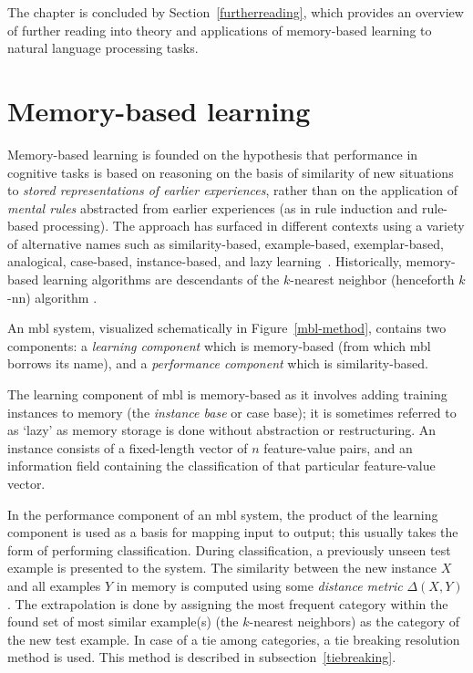\documentclass{report}
\begin{document}
The chapter is concluded by Section~\ref{furtherreading}, which
provides an overview of further reading into theory and applications
of memory-based learning to natural language processing tasks.

\section{Memory-based learning}
\label{mbl}

Memory-based learning is founded on the hypothesis that performance in
cognitive tasks is based on reasoning on the basis of similarity of
new situations to {\em stored representations of earlier experiences},
rather than on the application of {\em mental rules}\/ abstracted from
earlier experiences (as in rule induction and rule-based processing).
The approach has surfaced in different contexts using a variety of
alternative names such as similarity-based, example-based,
exemplar-based, analogical, case-based, in\-stance-based, and lazy
learning~\cite{Stanfill+86,Aha+91,Cost+93,Kolodner93,Aha97a}.
Historically, memory-based learning algorithms are descendants of the
$k$-nearest neighbor (henceforth $k$-{\sc nn}) algorithm
\cite{Cover+67,Devijver+82,Aha+91}.

An {\sc mbl} system, visualized schematically in
Figure~\ref{mbl-method}, contains two components: a {\em learning
component}\/ which is memory-based (from which {\sc mbl} borrows its
name), and a {\em performance component}\/ which is similarity-based.

The learning component of {\sc mbl} is memory-based as it involves
adding training instances to memory (the {\em instance base} or case
base); it is sometimes referred to as `lazy' as memory storage is done
without abstraction or restructuring.  An instance consists of a
fixed-length vector of $n$ feature-value pairs, and an information
field containing the classification of that particular feature-value
vector.  

In the performance component of an {\sc mbl} system, the product of
the learning component is used as a basis for mapping input to output;
this usually takes the form of performing classification.  During
classification, a previously unseen test example is presented to the
system. The similarity between the new instance $X$ and all examples
$Y$ in memory is computed using some {\em distance metric}
$\Delta(X,Y)$. The extrapolation is done by assigning the most
frequent category within the found set of most similar example(s) (the
$k$-nearest neighbors) as the category of the new test example. In
case of a tie among categories, a tie breaking resolution method is
used. This method is described in subsection~\ref{tiebreaking}.
\end{document}
